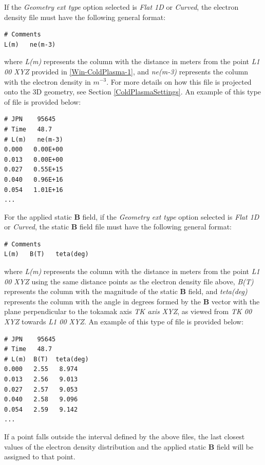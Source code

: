 If the \emph{Geometry ext type} option selected is \textit{Flat 1D} or \textit{Curved}, the electron density file must have the following general format:
\begin{small}\begin{lstlisting}
# Comments	 
L(m)   ne(m-3)	
\end{lstlisting}\end{small} 
where \textit{L(m)} represents the column with the distance in meters from the point \textit{L1 00 XYZ} provided in \ref{Win-ColdPlasma-1}, and \textit{ne(m-3)} represents the column with the electron density in $m^{-3}$. For more details on how this file is projected onto the 3D geometry, see Section \ref{ColdPlasmaSettings}. An example of this type of file is provided below:
\begin{small}\begin{lstlisting}
# JPN    95645	 
# Time   48.7	
# L(m)	 ne(m-3)	
0.000   0.00E+00
0.013   0.00E+00
0.027   0.55E+15
0.040   0.96E+16
0.054   1.01E+16
...
\end{lstlisting}\end{small} 
For the applied static \textbf{B} field, if the \emph{Geometry ext type} option selected is \textit{Flat 1D} or \textit{Curved}, the static \textbf{B} field file must have the following general format:
\begin{small}\begin{lstlisting}
# Comments	 
L(m)   B(T)   teta(deg)
\end{lstlisting}\end{small} 
where \textit{L(m)} represents the column with the distance in meters from the point \textit{L1 00 XYZ} using the same distance points as the electron density file above, \textit{B(T)} represents the column with the magnitude of the static \textbf{B} field, and \textit{teta(deg)} represents the column with the angle in degrees formed by the \textbf{B} vector with the plane perpendicular to the tokamak axis \textit{TK axis XYZ}, as viewed from \textit{TK 00 XYZ} towards \textit{L1 00 XYZ}. An example of this type of file is provided below:
\begin{small}\begin{lstlisting}
# JPN    95645	 
# Time   48.7	
# L(m)  B(T)  teta(deg)
0.000   2.55   8.974
0.013   2.56   9.013
0.027   2.57   9.053
0.040   2.58   9.096
0.054   2.59   9.142
...
\end{lstlisting}\end{small} 
If a point falls outside the interval defined by the above files, the last closest values of the electron density distribution and the applied static \textbf{B} field will be assigned to that point. 

